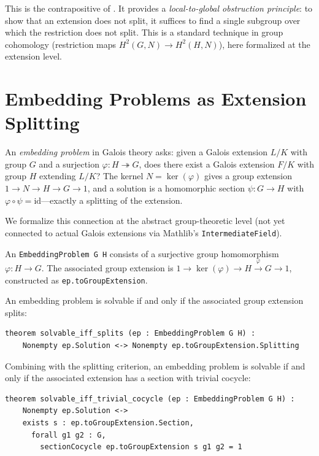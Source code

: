 \documentclass[11pt]{article}
\newcommand{\id}{\mathrm{id}}
\newcommand{\lean}[1]{\texttt{#1}}
\begin{document}
\noindent
This is the contrapositive of .  It provides a
\emph{local-to-global obstruction principle}: to show that an extension does not
split, it suffices to find a single subgroup over which the restriction does not
split.  This is a standard technique in group cohomology (restriction maps
$H^2(G, N) \to H^2(H, N)$), here formalized at the extension level.

\section{Embedding Problems as Extension Splitting}\label{sec:embedding}

An \emph{embedding problem} in Galois theory asks: given a Galois extension
$L/K$ with group $G$ and a surjection $\varphi : H \twoheadrightarrow G$, does
there exist a Galois extension $F/K$ with group $H$ extending $L/K$? The kernel
$N = \ker(\varphi)$ gives a group extension $1 \to N \to H \to G \to 1$, and a
solution is a homomorphic section $\psi : G \to H$ with
$\varphi \circ \psi = \id$---exactly a splitting of the extension.

We formalize this connection at the abstract group-theoretic level (not yet
connected to actual Galois extensions via Mathlib's \lean{IntermediateField}).

\begin{definition}\label{def:embedding}
An \lean{EmbeddingProblem G H} consists of a surjective group homomorphism
$\varphi : H \to G$. The associated group extension is
$1 \to \ker(\varphi) \to H \xrightarrow{\varphi} G \to 1$, constructed as
\lean{ep.toGroupExtension}.
\end{definition}

\begin{theorem}\label{thm:solvable-splits}
An embedding problem is solvable if and only if the associated group extension
splits:
\begin{lstlisting}
theorem solvable_iff_splits (ep : EmbeddingProblem G H) :
    Nonempty ep.Solution <-> Nonempty ep.toGroupExtension.Splitting
\end{lstlisting}
\end{theorem}

\begin{theorem}\label{thm:solvable-cocycle}
Combining with the splitting criterion, an embedding problem is solvable if and
only if the associated extension has a section with trivial cocycle:
\begin{lstlisting}
theorem solvable_iff_trivial_cocycle (ep : EmbeddingProblem G H) :
    Nonempty ep.Solution <->
    exists s : ep.toGroupExtension.Section,
      forall g1 g2 : G,
        sectionCocycle ep.toGroupExtension s g1 g2 = 1
\end{lstlisting}
\end{theorem}
\end{document}
